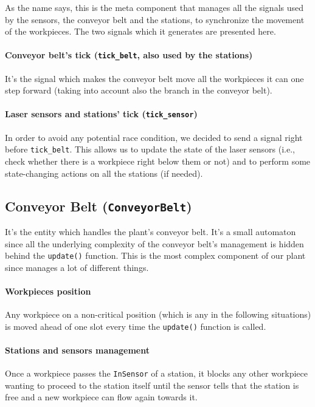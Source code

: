 \documentclass[a4paper]{article}
\begin{document}
    As the name says, this is the meta component that manages all the signals used by the sensors, the conveyor belt and the stations, to synchronize the movement of the workpieces. The two signals which it generates are presented here.

    \paragraph{Conveyor belt's tick (\texttt{tick\_belt}, also used by the stations)} It's the signal which makes the conveyor belt move all the workpieces it can one step forward (taking into account also the branch in the conveyor belt).

    \paragraph{Laser sensors and stations' tick (\texttt{tick\_sensor})} In order to avoid any potential race condition, we decided to send a signal right before \texttt{tick\_belt}. This allows us to update the state of the laser sensors (i.e., check whether there is a workpiece right below them or not) and to perform some state-changing actions on all the stations (if needed).

    \subsection{Conveyor Belt (\texttt{ConveyorBelt})}

    It's the entity which handles the plant's conveyor belt. It's a small automaton since all the underlying complexity of the conveyor belt's management is hidden behind the \texttt{update()} function. This is the most complex component of our plant since manages a lot of different things.

    \paragraph{Workpieces position} Any workpiece on a non-critical position (which is any in the following situations) is moved ahead of one slot every time the \texttt{update()} function is called.

    \paragraph{Stations and sensors management} Once a workpiece passes the \texttt{InSensor} of a station, it blocks any other workpiece wanting to proceed to the station itself until the sensor tells that the station is free and a new workpiece can flow again towards it.
\end{document}
